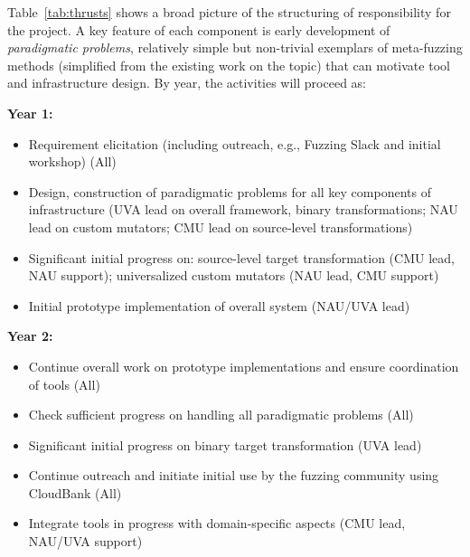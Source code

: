 Table~\ref{tab:thrusts} shows a broad picture of the structuring of
responsibility for the project.  A key feature of each component is early
development of \emph{paradigmatic problems}, relatively simple but
non-trivial exemplars of meta-fuzzing methods (simplified from the
existing work on the topic) that can motivate tool and infrastructure
design.  By year, the activities will proceed as:

\noindent\textbf{Year 1:} 
 \begin{itemize}[labelwidth=0.7em, labelsep=0.6em, topsep=0ex, itemsep=0ex,
  parsep=0ex, leftmargin=1.5em]
  \item Requirement elicitation (including outreach, e.g.,
    Fuzzing Slack and initial workshop) (All)
  \item Design, construction of paradigmatic problems for all key components of
  infrastructure (UVA lead on overall framework, binary transformations; NAU lead on custom mutators; CMU lead on source-level transformations)
  \item Significant initial progress on: source-level target transformation (CMU lead,
    NAU support); universalized custom mutators (NAU lead,
  CMU support)
  \item Initial prototype implementation of overall system (NAU/UVA lead)
\end{itemize}

\noindent\textbf{Year 2:}
\begin{itemize}[labelwidth=0.7em, labelsep=0.6em, topsep=0ex, itemsep=0ex,
  parsep=0ex, leftmargin=1.5em]
\item Continue overall work on prototype implementations and ensure
  coordination of tools (All)
  \item Check sufficient progress on handling all paradigmatic
    problems (All)
 \item Significant initial progress on binary target transformation (UVA lead)
  \item Continue outreach and initiate initial use by the fuzzing community using CloudBank (All)
    \item Integrate tools in progress with 
      domain-specific aspects (CMU lead, NAU/UVA support)
\end{itemize}


